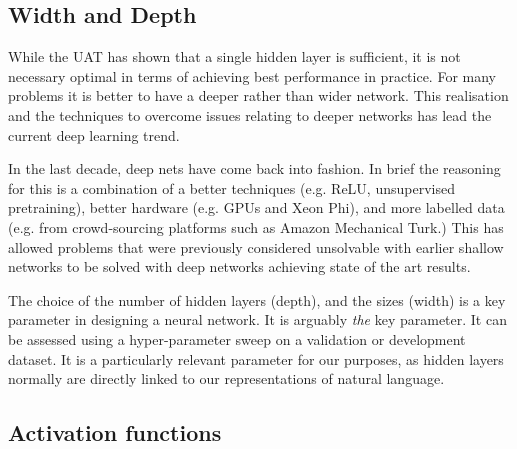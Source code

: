 \documentclass[12pt,parskip]{komatufte}
\begin{document}
\subsection{Width and Depth}
While the UAT has shown that a single hidden layer is sufficient,
it is not necessary optimal in terms of achieving best performance in practice.
For many problems it is better to have a deeper rather than wider network.
This realisation and the techniques to overcome issues relating to deeper networks has lead the current deep learning trend.

In the last decade, deep nets have come back into fashion.
In brief the reasoning for this is a combination of a better techniques (e.g. ReLU, unsupervised pretraining),
better hardware (e.g. GPUs and Xeon Phi), and more labelled data (e.g. from crowd-sourcing platforms such as Amazon Mechanical Turk.)
This has allowed problems that were previously considered unsolvable with earlier shallow networks to be solved with deep networks achieving state of the art results.


The choice of the number of hidden layers (depth),
and the sizes (width) is a key parameter in designing a neural network.
It is arguably \emph{the} key parameter.
It can be assessed using a hyper-parameter sweep on a validation or development dataset.
It is a particularly relevant parameter for our purposes, as hidden layers normally are directly linked to our representations of natural language.



\subsection{Activation functions}

\end{document}
